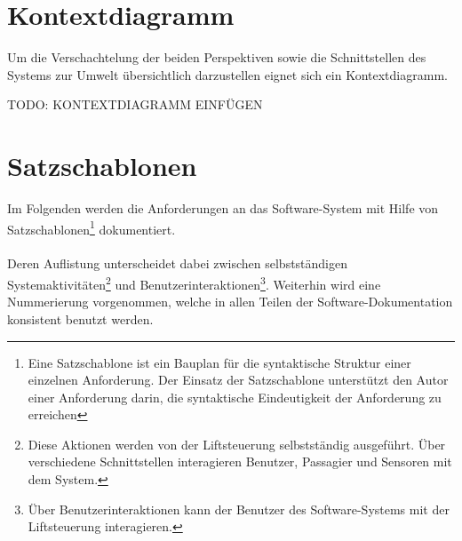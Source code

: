 \newpage
\section{Kontextdiagramm}
Um die Verschachtelung der beiden Perspektiven sowie die Schnittstellen des Systems zur Umwelt übersichtlich darzustellen eignet sich ein Kontextdiagramm. 

TODO: KONTEXTDIAGRAMM EINFÜGEN

\newpage
\section{Satzschablonen}
Im Folgenden werden die Anforderungen an das Software-System mit Hilfe von Satzschablonen\footnote{Eine Satzschablone ist ein Bauplan für die syntaktische Struktur einer einzelnen Anforderung. Der Einsatz der Satzschablone unterstützt den Autor einer Anforderung darin, die syntaktische Eindeutigkeit der Anforderung zu erreichen} dokumentiert.

\paragraph{}
Deren Auflistung unterscheidet dabei zwischen selbstständigen Systemaktivitäten\footnote{Diese Aktionen werden von der Liftsteuerung selbstständig ausgeführt. Über verschiedene Schnittstellen interagieren Benutzer, Passagier und Sensoren mit dem System.} und Benutzerinteraktionen\footnote{Über Benutzerinteraktionen kann der Benutzer des Software-Systems mit der Liftsteuerung interagieren.}. Weiterhin wird eine Nummerierung vorgenommen, welche in allen Teilen der Software-Dokumentation konsistent benutzt werden.

